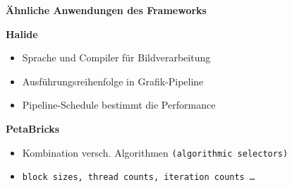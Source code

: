 %    

 \begingroup
\begin{frame}
  \textbf{Ähnliche Anwendungen des Frameworks} \newline
  
 
  \textbf{Halide}
  \begin{itemize}
    \item Sprache und Compiler für Bildverarbeitung
    \item Ausführungsreihenfolge in Grafik-Pipeline
    \item Pipeline-Schedule bestimmt die Performance
   \end{itemize}
   
%    
%   
%    
    
   \text{}
   
   \textbf{PetaBricks}
   \begin{itemize}
     \item Kombination versch. Algorithmen \texttt{(algorithmic selectors)}
     \item \texttt{block sizes, thread counts, iteration counts …}
   \end{itemize}
\end{frame}
\endgroup
    
 \begingroup

